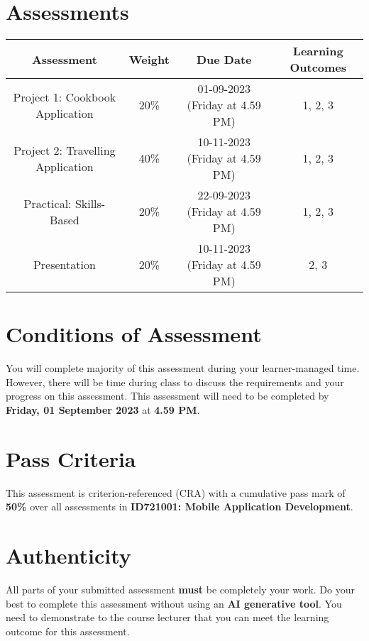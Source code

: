 \documentclass{article}
\begin{document}
\section*{Assessments}
\renewcommand{\arraystretch}{1.5}
\begin{tabular}{|c|c|c|c|}
	\hline
	\textbf{Assessment} & \textbf{Weight} & \textbf{Due Date}    & \textbf{Learning Outcomes} \\ \hline
	Project 1: Cookbook Application            & 20\%            & 01-09-2023 (Friday at 4.59 PM)  & 1, 2, 3                    \\ \hline
	Project 2: Travelling Application            & 40\%            & 10-11-2023 (Friday at 4.59 PM)  & 1, 2, 3                    \\ \hline
	Practical: Skills-Based           & 20\%            & 22-09-2023 (Friday at 4.59 PM)  & 1, 2, 3                    \\ \hline
	Presentation       & 20\%            & 10-11-2023 (Friday at 4.59 PM) & 2, 3                       \\ \hline
\end{tabular}

\section*{Conditions of Assessment}
You will complete majority of this assessment during your learner-managed time. However, there will be time during class to discuss the requirements and your progress on this assessment. This assessment will need to be completed by \textbf{Friday, 01 September 2023} at \textbf{4.59 PM}.

\section*{Pass Criteria}
This assessment is criterion-referenced (CRA) with a cumulative pass mark of \textbf{50\%} over all assessments in \textbf{ID721001: Mobile Application Development}.

\section*{Authenticity}
All parts of your submitted assessment \textbf{must} be completely your work. Do your best to complete this assessment without using an \textbf{AI generative tool}. You need to demonstrate to the course lecturer that you can meet the learning outcome for this assessment. \\
 
\end{document}
